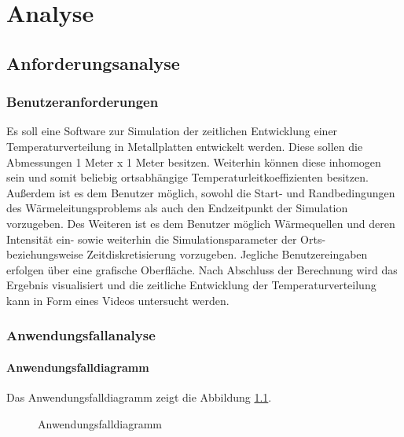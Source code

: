 \chapter{Analyse}
\section{Anforderungsanalyse}

\subsection{Benutzeranforderungen}

Es soll eine Software zur Simulation der zeitlichen Entwicklung einer Temperaturverteilung in Metallplatten entwickelt werden. Diese sollen die Abmessungen 1 Meter x 1 Meter besitzen. Weiterhin können diese inhomogen sein und somit beliebig ortsabhängige Temperaturleitkoeffizienten besitzen. Außerdem ist es dem Benutzer möglich, sowohl die Start- und Randbedingungen des Wärmeleitungsproblems als auch den Endzeitpunkt der Simulation vorzugeben. Des Weiteren ist es dem Benutzer möglich Wärmequellen und deren Intensität ein- sowie weiterhin die Simulationsparameter der Orts- beziehungsweise Zeitdiskretisierung vorzugeben. Jegliche Benutzereingaben erfolgen über eine grafische Oberfläche. Nach Abschluss der Berechnung wird das Ergebnis visualisiert und die zeitliche Entwicklung der Temperaturverteilung kann in Form eines Videos untersucht werden.


\subsection{Anwendungsfallanalyse} \label{Kapitel Use Case Analyse}

\subsubsection{Anwendungsfalldiagramm}
Das Anwendungsfalldiagramm zeigt die Abbildung \ref{Use Case Diagramm}.
\begin{figure}[H]
	\centering
	\caption{Anwendungsfalldiagramm}
	\label{Use Case Diagramm}
\end{figure}

